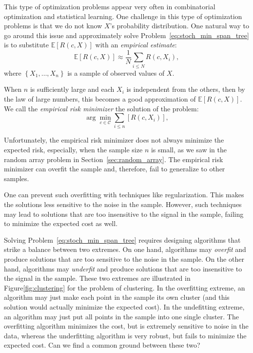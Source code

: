 This type of optimization problems appear very often in combinatorial optimization and statistical learning. One challenge in this type of optimization problems is that we do not know $X$'s probability distribution.
One natural way to go around this issue and approximately solve Problem~\ref{eq:stoch_min_span_tree} is to substitute $\mathbb{E}\left[R(c, X)\right]$ with an \emph{empirical estimate}:
%
$$\mathbb{E}\left[R(c, X)\right] \approx \frac{1}{N}\sum_{i \leq N} R(c, X_i),$$
%
where $\left\{X_1, \ldots, X_n\right\}$ is a sample of observed values of $X$.

When $n$ is sufficiently large and each $X_i$ is independent from the others, then by the law of large numbers, this becomes a good approximation of $\mathbb{E}\left[R(c, X)\right]$. We call the \emph{empirical risk minimizer} the solution of the problem:
%
\begin{equation}
\arg \min_{c \in \mathcal{C}} \sum_{i \leq n}\left[R(c, X_i)\right],
\label{eq:erm}
\end{equation}

Unfortunately, the empirical risk minimizer does not always minimize the expected risk, especially, when the sample size $n$ is small, as we saw in the random array problem in Section~\ref{sec:random_array}. The empirical risk minimizer can overfit the sample and, therefore, fail to generalize to other samples.

One can prevent such overfitting with techniques like regularization. This makes the solutions less sensitive to the noise in the sample. However, such techniques may lead to solutions that are too insensitive to the signal in the sample, failing to minimize the expected cost as well.

Solving Problem~\ref{eq:stoch_min_span_tree} requires designing algorithms that strike a balance between two extremes. On one hand, algorithms may \emph{overfit} and produce solutions that are too sensitive to the noise in the sample. On the other hand, algorithms may \emph{underfit} and produce solutions that are too insensitive to the signal in the sample. These two extremes are illustrated in Figure\ref{fig:clustering}\todo{} for the problem of clustering. In the overfitting extreme, an algorithm may just make each point in the sample its own cluster (and this solution would actually minimize the expected cost). In the undefitting extreme, an algorithm may just put all points in the sample into one single cluster. The overfitting algorithm minimizes the cost, but is extremely sensitive to noise in the data, whereas the underfitting algorithm is very robust, but fails to minimize the expected cost. Can we find a common ground between these two?

